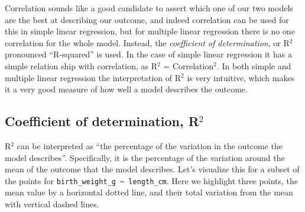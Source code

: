 \documentclass[
  letterpaper,
  DIV=11,
  numbers=noendperiod]{scrreprt}
\begin{document}
Correlation sounds like a good candidate to assert which one of our two
models are the best at describing our outcome, and indeed correlation
can be used for this in simple linear regression, but for multiple
linear regression there is no one correlation for the whole model.
Instead, the \emph{coefficient of determination}, or R\(^2\) pronounced
``R-squared'' is used. In the case of simple linear regression it has a
simple relation ship with correlation, as R\(^2\) = Correlation\(^2\).
In both simple and multiple linear regression the interpretation of
R\(^2\) is very intuitive, which makes it a very good measure of how
well a model describes the outcome.

\subsection{\texorpdfstring{Coefficient of determination,
R\(^2\)}{Coefficient of determination, R\^{}2}}\label{coefficient-of-determination-r2}

R\(^2\) can be interpreted as ``the percentage of the variation in the
outcome the model describes''. Specifically, it is the percentage of the
variation around the mean of the outcome that the model describes. Let's
visualize this for a subset of the points for
\texttt{birth\_weight\_g\ \textasciitilde{}\ length\_cm}. Here we
highlight three points, the mean value by a horizontal dotted line, and
their total variation from the mean with vertical dashed lines.
\end{document}
